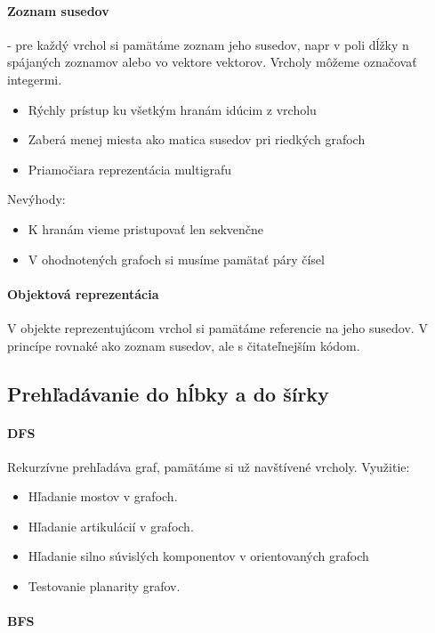 		\paragraph{Zoznam susedov} - pre každý vrchol si pamätáme zoznam jeho susedov, napr v poli dĺžky n spájaných zoznamov alebo vo vektore vektorov. Vrcholy môžeme označovať integermi.
		\begin{itemize}
			\item Rýchly prístup ku všetkým hranám idúcim z vrcholu
			\item Zaberá menej miesta ako matica susedov pri riedkých grafoch
			\item Priamočiara reprezentácia multigrafu
		\end{itemize}
		Nevýhody:
		\begin{itemize}
			\item K hranám vieme pristupovať len sekvenčne
			\item V ohodnotených grafoch si musíme pamätať páry čísel
		\end{itemize}


		\paragraph{Objektová reprezentácia}
		V objekte reprezentujúcom vrchol si pamätáme referencie na jeho susedov. V princípe rovnaké ako zoznam susedov, ale s čitateľnejším kódom.

	\subsection{Prehľadávanie do hĺbky a do šírky}
		\paragraph{DFS}
			Rekurzívne prehľadáva graf, pamätáme si už navštívené vrcholy.
			Využitie: 
			\begin{itemize}
				\item Hľadanie mostov v grafoch.
				\item Hľadanie artikulácií v grafoch.
				\item Hľadanie silno súvislých komponentov v orientovaných grafoch
				\item Testovanie planarity grafov.
			\end{itemize}


		\paragraph{BFS}

